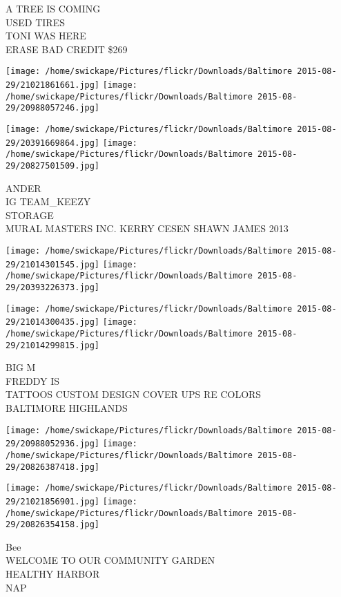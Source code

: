 \documentclass[10pt,letterpaper]{article}
\begin{document}
A TREE IS COMING\\
USED TIRES\\
TONI WAS HERE\\
ERASE BAD CREDIT \$269\\
\pagebreak

\texttt{[image: /home/swickape/Pictures/flickr/Downloads/Baltimore 2015-08-29/21021861661.jpg]}
\texttt{[image: /home/swickape/Pictures/flickr/Downloads/Baltimore 2015-08-29/20988057246.jpg]}

\texttt{[image: /home/swickape/Pictures/flickr/Downloads/Baltimore 2015-08-29/20391669864.jpg]}
\texttt{[image: /home/swickape/Pictures/flickr/Downloads/Baltimore 2015-08-29/20827501509.jpg]}

ANDER\\
IG TEAM\_KEEZY\\
STORAGE\\
MURAL MASTERS INC. KERRY CESEN SHAWN JAMES 2013\\
\pagebreak

\texttt{[image: /home/swickape/Pictures/flickr/Downloads/Baltimore 2015-08-29/21014301545.jpg]}
\texttt{[image: /home/swickape/Pictures/flickr/Downloads/Baltimore 2015-08-29/20393226373.jpg]}

\texttt{[image: /home/swickape/Pictures/flickr/Downloads/Baltimore 2015-08-29/21014300435.jpg]}
\texttt{[image: /home/swickape/Pictures/flickr/Downloads/Baltimore 2015-08-29/21014299815.jpg]}

BIG M\\
FREDDY IS\\
TATTOOS CUSTOM DESIGN COVER UPS RE COLORS\\
BALTIMORE HIGHLANDS\\
\pagebreak

\texttt{[image: /home/swickape/Pictures/flickr/Downloads/Baltimore 2015-08-29/20988052936.jpg]}
\texttt{[image: /home/swickape/Pictures/flickr/Downloads/Baltimore 2015-08-29/20826387418.jpg]}

\texttt{[image: /home/swickape/Pictures/flickr/Downloads/Baltimore 2015-08-29/21021856901.jpg]}
\texttt{[image: /home/swickape/Pictures/flickr/Downloads/Baltimore 2015-08-29/20826354158.jpg]}

Bee\\
WELCOME TO OUR COMMUNITY GARDEN\\
HEALTHY HARBOR\\
NAP\\
\pagebreak
\end{document}

